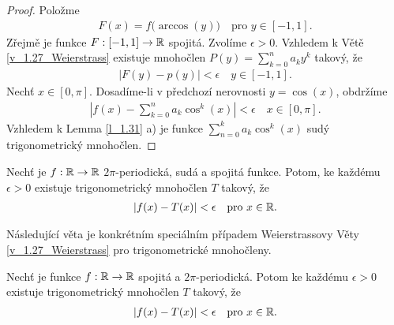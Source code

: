 \begin{proof}
Položme
\begin{align*}
F(x)=f\big(\arccos(y)\big) \quad \text{pro $y \in [-1,1]$.}
\end{align*}
Zřejmě je funkce $F:[-1,1] \to \mathbb{R}$ spojitá. 
Zvolíme $\epsilon >0$. 
Vzhledem k Větě \ref{v_1.27_Weierstrass} existuje mnohočlen $P(y)=\sum \limits _{k=0}^n a_k y^k$ takový, že
\begin{align*}
|F(y)-p(y)|< \epsilon \quad \text{$y \in [-1,1]$.}
\end{align*}
Nechť $x \in [0, \pi]$. Dosadíme-li v předchozí nerovnosti $y=\cos(x)$, obdržíme
\begin{align*}
|f(x)-\sum \limits _{k=0}^{n} a_k \cos^k(x)|< \epsilon \quad \text{$x \in [0, \pi]$.}
\end{align*}
Vzhledem k Lemma \ref{l_1.31} a) je funkce $\sum \limits_{n=0}^{k}a_k \cos^k(x)$ sudý trigonometrický mnohočlen.
\end{proof}


\begin{dusledek}
Nechť je $f:\mathbb{R} \to \mathbb{R}$ $2\pi$-periodická, sudá a spojitá funkce. 
Potom, ke každému $\epsilon>0$ existuje trigonometrický mnohočlen $T$ takový, že 
\begin{align*}
|f(x)-T(x)|< \epsilon \quad \text{pro $x \in \mathbb{R}$}.
\end{align*}
\label{d_1.33}
\end{dusledek}

Následující věta je konkrétním speciálním případem Weierstrassovy Věty \ref{v_1.27_Weierstrass} pro trigonometrické mnohočleny.

\begin{theorem}[Weierstrass]
Nechť je funkce $f:\mathbb{R} \to \mathbb{R}$ spojitá a $2\pi$-periodická. 
Potom ke každému $\epsilon >0$ existuje trigonometrický mnohočlen $T$ takový, že 
\begin{align*}
|f(x)-T(x)|< \epsilon \quad \text{pro $x \in \mathbb{R}$}.
\end{align*}
\end{theorem}

